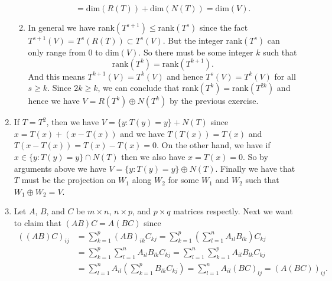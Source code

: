 \begin{enumerate}
\begin{enumerate}
\[=\mathrm{dim}(R(T))+\mathrm{dim}(N(T))=\mathrm{dim}(V).\]
\item In general we have rank$(T^{s+1})\leq $rank$(T^s)$ since the fact $T^{s+1}(V)=T^s(R(T))\subset T^s(V)$. But the integer rank$(T^s)$ can only range from $0$ to dim$(V)$. So there must be some integer $k$ such that 
\[\mathrm{rank}(T^k)=\mathrm{rank}(T^{k+1}).\]
 And this means $T^{k+1}(V)=T^k(V)$ and hence $T^s(V)=T^k(V)$ for all $s\geq k$. Since $2k\geq k$, we can conclude that rank$(T^k)=$rank$(T^{2k})$ and hence we have $V=R(T^k)\oplus N(T^k)$ by the previous exercise.
\end{enumerate}
\item If $T=T^2$, then we have $V=\{y:T(y)=y\}+N(T)$ since $x=T(x)+(x-T(x))$ and we have $T(T(x))=T(x)$ and $T(x-T(x))=T(x)-T(x)=0$. On the other hand, we have if $x\in \{y:T(y)=y\}\cap N(T)$ then we also have $x=T(x)=0$. So by arguments above we have $V=\{y:T(y)=y\}\oplus N(T)$. Finally we have that $T$ must be the projection on $W_1$ along $W_2$ for some $W_1$ and $W_2$ such that $W_1\oplus W_2=V$.
\item Let $A$, $B$, and $C$ be $m\times n$, $n\times p$, and $p\times q$ matrices respectly. Next we want to claim that $(AB)C=A(BC)$ since 
\begin{align*}
((AB)C)_{ij}&=\sum_{k=1}^p{(AB)_{ik}C_{kj}}=\sum_{k=1}^p{(\sum_{l=1}^n{A_{il}B_{lk}})C_{kj}}\\
&=\sum_{k=1}^p{\sum_{l=1}^n{A_{il}B_{lk}C_{kj}}}=\sum_{l=1}^n{\sum_{k=1}^p{A_{il}B_{lk}C_{kj}}}\\
&=\sum_{l=1}^n{A_{il}(\sum_{k=1}^p{B_{lk}C_{kj}})}=\sum_{l=1}^n{A_{il}(BC)_{lj}}=(A(BC))_{ij}.
\end{align*}


\end{enumerate}
